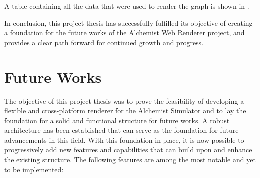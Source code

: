 A table containing all the data that were used to render the graph is shown in .\newline


In conclusion, this project thesis has successfully fulfilled its objective of creating a foundation for the future works of the Alchemist Web Renderer project, and provides a clear path forward for continued growth and progress.\newline


\section{Future Works}
\label{sec:future-works}
The objective of this project thesis was to prove the feasibility of developing a flexible and cross-platform renderer for the Alchemist Simulator and to lay the foundation for a solid and functional structure for future works. A robust architecture has been established that can serve as the foundation for future advancements in this field. With this foundation in place, it is now possible to progressively add new features and capabilities that can build upon and enhance the existing structure. The following features are among the most notable and yet to be implemented:
